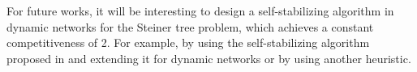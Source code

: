 \documentclass[11pt]{article}
\begin{document}
For future works, it will be interesting to design a self-stabilizing algorithm in dynamic networks for the Steiner tree problem, which achieves a constant competitiveness of 2. For example, by using the self-stabilizing algorithm proposed in \cite{Kakugawa_Steiner_journal} and extending it for dynamic networks or by using another heuristic.



\end{document}
